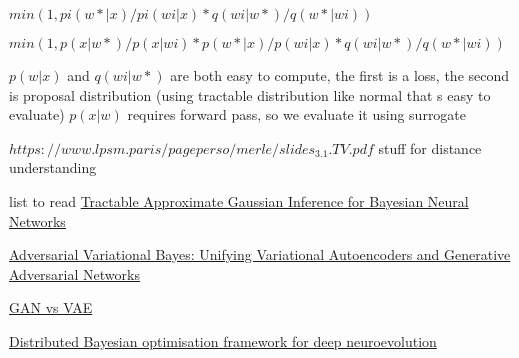 \documentclass[honours,12pt]{unswthesis}
\numberwithin{equation}{section}
\begin{document}
    $min(1, pi(w*|x)/pi(wi|x) *  q(wi|w*)/q(w*|wi) )$
    
    $min(1, p(x|w*)/p(x|wi) * p(w*|x)/p(wi|x) *  q(wi|w*)/q(w*|wi) )$

    $p(w|x)$ and $q(wi|w*)$ are both easy to compute, the first is a loss, the second is proposal distribution (using tractable distribution like normal that s easy to evaluate)    
    $p(x|w)$ requires forward pass, so we evaluate it using surrogate


\noindent $https://www.lpsm.paris/pageperso/merle/slides_3.1.TV.pdf$ stuff for distance understanding

list to read
\href{https://jmlr.org/papers/volume22/20-1009/20-1009.pdf}{Tractable Approximate Gaussian Inference for
Bayesian Neural Networks
}

\href{https://arxiv.org/pdf/1701.04722.pdf}{Adversarial Variational Bayes:
Unifying Variational Autoencoders and Generative Adversarial Networks}

\href{https://towardsdatascience.com/gans-vs-autoencoders-comparison-of-deep-generative-models-985cf15936ea}{GAN vs VAE}

\href{https://pdf.sciencedirectassets.com/271597/1-s2.0-S0925231221X00409/1-s2.0-S0925231221015319/main.pdf?X-Amz-Security-Token=IQoJb3JpZ2luX2VjEAsaCXVzLWVhc3QtMSJGMEQCIFyD6EVhq7gdc13HAw8Qa2abqSEg7RfyW64DmMVAwR%2FAAiAx%2FqYNhfvEXwgQS08r%2FMhhr5VEr%2Be%2BKQ7Nbt9dBYn1iir6AwgjEAQaDDA1OTAwMzU0Njg2NSIMzSUp5Xe14ZtAoyoUKtcD5V8UPCBeS1sryr6y2PzuwXdsx%2FBvmdgsnfgRx1Acrgomb7ZC%2BVpRecYAvucvzsgbXwr4%2FY23IWXOjQVvqaIcF9d6%2F3VF5lJjfBtqyUDoUAZ6fMfSVsgKbMRkbIK%2BUaZot4%2BXfz7LLN3HZla8oHd2sTktGlGF8x4e9UR2PONy%2FZt%2B8Le6H%2FpmTQOEChAS5I23%2Bw0g%2BbW%2B%2FMIOpbdP4tGzrxVpJX4swn1N5QW4SIVF1abKsksuJPt%2FAGLYy%2BzlTEGZ55ycsE0DO3HIQHzRcQcO0MCYd0GcP8sNOmRCk3Jay5KLK%2FPdw0xHow7982Mra1vNMPHgcNPESFshdfg3ukTsqBWWi6AsbEiYJwJDbO1CHpZ4WGllcAvKc91KyLqQE6XUSLzJUCykxTtb1rvjq9ypjki44bdW2ROmKJ%2BymoRnGspYm8U%2FweObZTTKA5LygERVcMPMXLutBWzdSJxvE2DoRgTx5gUpkEpOblBl4QYSwGRFfy1RwxilaNC82XhmeEPUUySfONoSD%2BdRZJk4gtNUjrBJKTtXe7PK8UrnhLybytQ%2BBZTZEl7iU5yb1Zc5jtiGinqiB3FNJ%2BMadk3%2B5ZtfRK2E%2BI5ETcjD6uUYt44KY4kx93sSt%2BAMMNXO844GOqYBLuihn5E46ZnGuLqmP2PzNJSAQ%2F%2Fx6X4SDKC8iS2%2FUaj7e5GPNb69qrcYy%2BnYMmk1XyXxk%2FBmpBj7oKIaS3Xu1GvczXn1i1keem794sv93urWnxC7hYa5Rlx9S2cLqOM9mcNsq1xy6R7lKu2T2of2NvbRYDIjIN1BVAHkr0BWiGSL5L4bFyeJwVgfajomw31LAznCz5G7Arbl3L8EssueNZ2DjR7LVw%3D%3D&X-Amz-Algorithm=AWS4-HMAC-SHA256&X-Amz-Date=20220111T025152Z&X-Amz-SignedHeaders=host&X-Amz-Expires=300&X-Amz-Credential=ASIAQ3PHCVTYWCQOVEXF%2F20220111%2Fus-east-1%2Fs3%2Faws4_request&X-Amz-Signature=63ecad95ada9138a0f14d0c02a0a2f2b564d4ca6a5d6e7e02d06e8a7667310c1&hash=e5ac045fcf223511dbac539722bc02c21c35d61165b6e09cd3e194252b56c49e&host=68042c943591013ac2b2430a89b270f6af2c76d8dfd086a07176afe7c76c2c61&pii=S0925231221015319&tid=spdf-4e567811-c9bc-4491-a143-d0a95da3d0eb&sid=d01637fd29bfb242294978015ea29ea8700bgxrqa&type=client#page=1&zoom=100,0,0}{Distributed Bayesian optimisation framework for deep neuroevolution}
\end{document}
